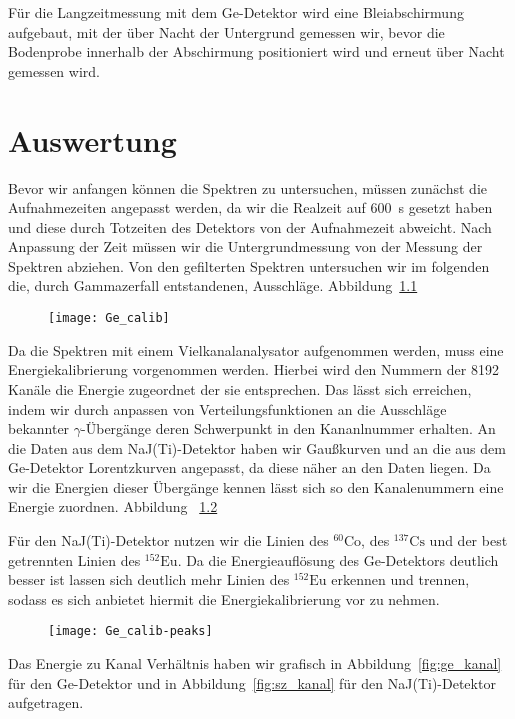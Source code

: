 \documentclass[11pt, ngerman, fleqn, DIV=15, headinclude, BCOR=2cm]{scrreprt}
\newcommand{\plotwidth}{0.8\linewidth}
\begin{document}
Für die Langzeitmessung mit dem Ge-Detektor wird eine Bleiabschirmung
aufgebaut, mit der über Nacht der Untergrund gemessen wir, bevor die Bodenprobe
innerhalb der Abschirmung positioniert wird und erneut über Nacht gemessen wird.

\chapter{Auswertung}

Bevor wir anfangen können die Spektren zu untersuchen, müssen zunächst die
Aufnahmezeiten angepasst werden, da wir die Realzeit auf \SI{600}{\second} gesetzt
haben und diese durch Totzeiten des Detektors von der Aufnahmezeit abweicht.
Nach Anpassung der Zeit müssen wir die
Untergrundmessung von der Messung der Spektren abziehen.
Von den gefilterten Spektren untersuchen wir im folgenden die, durch
Gammazerfall entstandenen, Ausschläge. Abbildung~\ref{fig:energiekalibrierung}


\begin{figure}
    \centering
    \texttt{[image: Ge\_calib]}
    \caption{%
    }
    \label{fig:energiekalibrierung}
\end{figure}

Da die Spektren mit einem Vielkanalanalysator aufgenommen werden, muss eine
Energiekalibrierung vorgenommen werden. Hierbei wird den Nummern der 8192
Kanäle die Energie zugeordnet der sie entsprechen.
Das lässt sich erreichen, indem wir durch anpassen von Verteilungsfunktionen an die
Ausschläge bekannter $\gamma$-Übergänge deren Schwerpunkt in den Kananlnummer
erhalten. An die Daten aus dem NaJ(Ti)-Detektor haben wir Gaußkurven und an die
aus dem Ge-Detektor Lorentzkurven angepasst, da diese näher an den Daten liegen.
Da wir die Energien dieser Übergänge kennen lässt sich so den
Kanalenummern eine Energie zuordnen. Abbildung ~\ref{fig:Ge-peaks}

Für den NaJ(Ti)-Detektor nutzen wir die Linien des $^{60}\text{Co}$, des
$^{137}\text{Cs}$ und der best getrennten Linien des $^{152}\text{Eu}$.
Da die Energieauflösung des Ge-Detektors deutlich besser ist lassen sich
deutlich mehr Linien des $^{152}\text{Eu}$ erkennen und trennen, sodass es sich
anbietet hiermit die Energiekalibrierung vor zu nehmen.

\begin{figure}
    \centering
    \texttt{[image: Ge\_calib-peaks]}
    \caption{%
    }
    \label{fig:Ge-peaks}

\end{figure}
Das Energie zu Kanal Verhältnis haben wir grafisch in
Abbildung~\ref{fig:ge_kanal} für den
Ge-Detektor und in Abbildung~\ref{fig:sz_kanal} für den NaJ(Ti)-Detektor aufgetragen.
\end{document}
